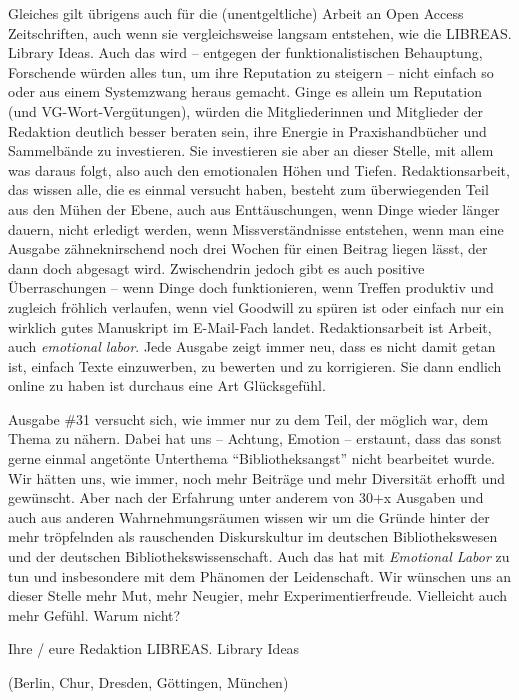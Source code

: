 \documentclass[a4paper,
fontsize=11pt,
oneside,
numbers=noperiodatend,
parskip=half-,
bibliography=totoc,
final
]{scrartcl}
\begin{document}
Gleiches gilt übrigens auch für die (unentgeltliche) Arbeit an Open
Access Zeitschriften, auch wenn sie vergleichsweise langsam entstehen,
wie die LIBREAS. Library Ideas. Auch das wird -- entgegen der
funktionalistischen Behauptung, Forschende würden alles tun, um ihre
Reputation zu steigern -- nicht einfach so oder aus einem Systemzwang
heraus gemacht. Ginge es allein um Reputation (und VG-Wort-Vergütungen),
würden die Mitgliederinnen und Mitglieder der Redaktion deutlich besser
beraten sein, ihre Energie in Praxishandbücher und Sammelbände zu
investieren. Sie investieren sie aber an dieser Stelle, mit allem was
daraus folgt, also auch den emotionalen Höhen und Tiefen.
Redaktionsarbeit, das wissen alle, die es einmal versucht haben, besteht
zum überwiegenden Teil aus den Mühen der Ebene, auch aus Enttäuschungen,
wenn Dinge wieder länger dauern, nicht erledigt werden, wenn
Missverständnisse entstehen, wenn man eine Ausgabe zähneknirschend noch
drei Wochen für einen Beitrag liegen lässt, der dann doch abgesagt wird.
Zwischendrin jedoch gibt es auch positive Überraschungen -- wenn Dinge
doch funktionieren, wenn Treffen produktiv und zugleich fröhlich
verlaufen, wenn viel Goodwill zu spüren ist oder einfach nur ein
wirklich gutes Manuskript im E-Mail-Fach landet. Redaktionsarbeit ist
Arbeit, auch \emph{emotional labor}. Jede Ausgabe zeigt immer neu, dass
es nicht damit getan ist, einfach Texte einzuwerben, zu bewerten und zu
korrigieren. Sie dann endlich online zu haben ist durchaus eine Art
Glücksgefühl.

Ausgabe \#31 versucht sich, wie immer nur zu dem Teil, der möglich war,
dem Thema zu nähern. Dabei hat uns -- Achtung, Emotion -- erstaunt, dass
das sonst gerne einmal angetönte Unterthema \enquote{Bibliotheksangst}
nicht bearbeitet wurde. Wir hätten uns, wie immer, noch mehr Beiträge
und mehr Diversität erhofft und gewünscht. Aber nach der Erfahrung unter
anderem von 30+x Ausgaben und auch aus anderen Wahrnehmungsräumen wissen
wir um die Gründe hinter der mehr tröpfelnden als rauschenden
Diskurskultur im deutschen Bibliothekswesen und der deutschen
Bibliothekswissenschaft. Auch das hat mit \emph{Emotional Labor} zu tun
und insbesondere mit dem Phänomen der Leidenschaft. Wir wünschen uns an
dieser Stelle mehr Mut, mehr Neugier, mehr Experimentierfreude.
Vielleicht auch mehr Gefühl. Warum nicht?

Ihre / eure Redaktion LIBREAS. Library Ideas

(Berlin, Chur, Dresden, Göttingen, München)

\end{document}

